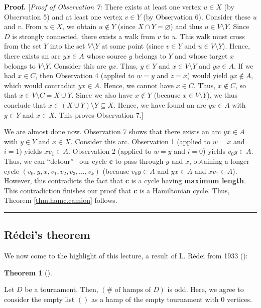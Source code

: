 \documentclass[numbers=enddot,12pt,final,onecolumn,notitlepage]{scrartcl}%
\numberwithin{exer}{subsection}
\theoremstyle{definition}
\newtheorem{theo}{Theorem}[subsection]
\newenvironment{theorem}[1][]
{\begin{theo}[#1]\begin{leftbar}}
{\end{leftbar}\end{theo}}
\newenvironment{proof}[1][Proof]{\noindent\textbf{#1.} }{\ \rule{0.5em}{0.5em}}
\begin{document}
\begin{proof}
[\textit{Proof of Observation 7:} There exists at least one vertex $u\in X$
(by Observation 5) and at least one vertex $v\in Y$ (by Observation 6).
Consider these $u$ and $v$. From $u\in X$, we obtain $u\notin Y$ (since $X\cap
Y=\varnothing$) and thus $u\in V\setminus Y$. Since $D$ is strongly connected,
there exists a walk from $v$ to $u$. This walk must cross from the set $Y$
into the set $V\setminus Y$ at some point (since $v\in Y$ and $u\in V\setminus
Y$). Hence, there exists an arc $yx\in A$ whose source $y$ belongs to $Y$ and
whose target $x$ belongs to $V\setminus Y$. Consider this arc $yx$. Thus,
$y\in Y$ and $x\in V\setminus Y$ and $yx\in A$. If we had $x\in C$, then
Observation 4 (applied to $w=y$ and $z=x$) would yield $yx\notin A$, which
would contradict $yx\in A$. Hence, we cannot have $x\in C$. Thus, $x\notin C$,
so that $x\in V\setminus C=X\cup Y$. Since we also have $x\notin Y$ (because
$x\in V\setminus Y$), we thus conclude that $x\in\left(  X\cup Y\right)
\setminus Y\subseteq X$. Hence, we have found an arc $yx\in A$ with $y\in Y$
and $x\in X$. This proves Observation 7.] \medskip

We are almost done now. Observation 7 shows that there exists an arc $yx\in A$
with $y\in Y$ and $x\in X$. Consider this arc. Observation 1 (applied to $w=x$
and $i=1$) yields $xv_{1}\in A$. Observation 2 (applied to $w=y$ and $i=0$)
yields $v_{0}y\in A$. Thus, we can \textquotedblleft detour\textquotedblright%
\ our cycle $\mathbf{c}$ to pass through $y$ and $x$, obtaining a longer cycle
$\left(  v_{0},y,x,v_{1},v_{2},v_{3},\ldots,v_{k}\right)  $ (because
$v_{0}y\in A$ and $yx\in A$ and $xv_{1}\in A$). However, this contradicts the
fact that $\mathbf{c}$ is a cycle having \textbf{maximum length}. This
contradiction finishes our proof that $\mathbf{c}$ is a Hamiltonian cycle.
Thus, Theorem \ref{thm.hamc.camion} follows.
\end{proof}

\subsection{R\'{e}dei's theorem}

We now come to the highlight of this lecture, a result of L. R\'{e}dei from
1933 (\cite[\S I]{Redei33}):

\begin{theorem}
[R\'{e}dei's Strong Theorem]\label{thm.tourn.redei}Let $D$ be a tournament.
Then, $\left(  \#\text{ of hamps of }D\right)  $ is odd. Here, we agree to
consider the empty list $\left(  {}\right)  $ as a hamp of the empty
tournament with $0$ vertices.
\end{theorem}
\end{document}
